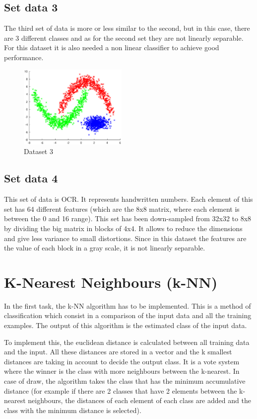 \documentclass{article}
\begin{document}
\subsection{Set data 3}
The third set of data is more or less similar to the second, but in this case, there are 3 different classes and as for the second set they are not linearly separable. For this dataset it is also needed a non linear classifier to achieve good performance.
\begin{figure}[H]
\centering
\includegraphics[height=4cm]{images/dataset3}
\caption{Dataset 3}
\label{fig:dataset3}
\end{figure}
\subsection{Set data 4}
This set of data is OCR. It represents handwritten numbers. Each element of this set has 64 different features (which are the 8x8 matrix, where each element is between the 0 and 16 range). This set has been down-sampled from 32x32 to 8x8 by dividing the big matrix in blocks of 4x4. It allows to reduce the dimensions and give less variance to small distortions. Since in this dataset the features are the value of each block in a gray scale, it is not linearly separable. 

\section{K-Nearest Neighbours (k-NN)}
In the first task, the k-NN algorithm has to be implemented. This is a method of classification which consist in a comparison of the input data and all the training examples. The output of this algorithm is the estimated class of the input data.

To implement this, the euclidean distance is calculated between all training data and the input. All these distances are stored in a vector and the k smallest distances are taking in account to decide the output class. It is a vote system where the winner is the class with more neighbours between the k-nearest. In case of draw, the algorithm takes the class that has the minimum accumulative distance (for example if there are 2 classes that have 2 elements between the k-nearest neighbours, the distances of each element of each class are added and the class with the minimum distance is selected).
\end{document}
